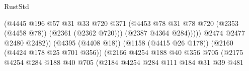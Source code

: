\begin{lexlean}{RustStd}
\begin{coremodule}
                                                          (@4445
                                                            @196
                                                            @57
                                                            @31
                                                            @33
                                                            @720
                                                            @371
                                                            (@4453
                                                              @78
                                                              @31
                                                              @78
                                                              @720
                                                              (@2353 (@4458 @78))
                                                              (@2361 (@2362 @720)))
                                                            (@2387 @4364 @284)))))
                                                    @2474
                                                    @2477
                                                    @2480
                                                    @2482))
                                                (@4395 (@4408 @18))
                                                (@1158 (@4415 @26 @178))
                                                (@2160 (@4424 @178 @25 @701 @356))
                                                (@2166
                                                  @4254
                                                  @188
                                                  @40
                                                  @356
                                                  @705
                                                  (@2175
                                                    @4254
                                                    @284
                                                    @188
                                                    @40
                                                    @705
                                                    (@2184
                                                      @4254
                                                      @284
                                                      @111
                                                      @184
                                                      @31
                                                      @39
                                                      @481

\end{coremodule}
\end{lexlean}
